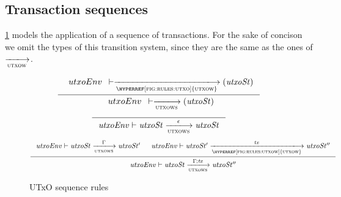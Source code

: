 \subsection{Transaction sequences}
\label{sec:transaction-seqs}

\cref{fig:rules:utxow-seq} models the application of a sequence of
transactions. For the sake of concison we omit the types of this transition
system, since they are the same as the ones of $\trans{utxow}{}$.

\begin{figure}[htb]
  \begin{equation}\label{eq:utxows-bootstrap}
    \inference
    {
      {\begin{array}{l}
         utxoEnv
      \end{array}}
      \vdash
      \trans{\hyperref[fig:rules:utxo]{utxow}}{}
      \left(
        \var{utxoSt}
      \right)
    }
    {
      {\begin{array}{l}
         utxoEnv
      \end{array}}
      \vdash
      \trans{utxows}{}
      \left(
        \var{utxoSt}
      \right)
    }
  \end{equation}
  \nextdef
  \begin{equation}
    \label{eq:rule:utxow-seq-base}
    \inference
    {}
    {\var{utxoEnv} \vdash \var{utxoSt} \trans{utxows}{\epsilon} \var{utxoSt}}
  \end{equation}
  \nextdef
  \begin{equation}
    \label{eq:rule:utxow-seq-ind}
    \inference
    {
      \var{utxoEnv} \vdash \var{utxoSt} \trans{utxows}{\Gamma} \var{utxoSt'}
      &
      \var{utxoEnv} \vdash \var{utxoSt'} \trans{\hyperref[fig:rules:utxow]{utxow}}{\var{tx}} \var{utxoSt''}
    }
    {\var{utxoEnv} \vdash \var{utxoSt} \trans{utxows}{\Gamma;\var{tx}} \var{utxoSt''}}
  \end{equation}
  \caption{UTxO sequence rules}
  \label{fig:rules:utxow-seq}
\end{figure}
